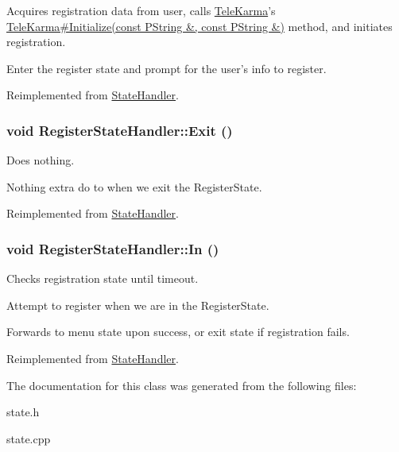Acquires registration data from user, calls \hyperlink{classTeleKarma}{TeleKarma}'s \hyperlink{classTeleKarma_94f24d2895a64c49d1d5daf9a5a40c7e}{TeleKarma\#Initialize(const PString \&, const PString \&)} method, and initiates registration. 

Enter the register state and prompt for the user's info to register.

Reimplemented from \hyperlink{classStateHandler_c08036e743cf5172d6931cf3b6d321c6}{StateHandler}.\hypertarget{classRegisterStateHandler_ce8f8dd19fb90516d5ee4db4ba1731d7}{
\subsubsection[{Exit}]{\setlength{\rightskip}{0pt plus 5cm}void RegisterStateHandler::Exit ()}}
\label{classRegisterStateHandler_ce8f8dd19fb90516d5ee4db4ba1731d7}


Does nothing. 

Nothing extra do to when we exit the RegisterState.

Reimplemented from \hyperlink{classStateHandler_5ce0f2cb3d4a9f5aca137d47eac75c1e}{StateHandler}.\hypertarget{classRegisterStateHandler_576721a87410fc48c0264a56a3b3d466}{
\subsubsection[{In}]{\setlength{\rightskip}{0pt plus 5cm}void RegisterStateHandler::In ()}}
\label{classRegisterStateHandler_576721a87410fc48c0264a56a3b3d466}


Checks registration state until timeout. 

Attempt to register when we are in the RegisterState.

Forwards to menu state upon success, or exit state if registration fails. 

Reimplemented from \hyperlink{classStateHandler_cee16f855e7354d21abafa47acd1046c}{StateHandler}.

The documentation for this class was generated from the following files:\begin{CompactItemize}
\item 
state.h\item 
state.cpp\end{CompactItemize}
